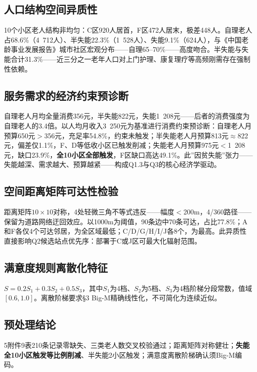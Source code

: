 \subsection{人口结构空间异质性}

10个小区老人结构非均匀：C区920人居首，F区472人居末，极差448人。自理老人占68.6\%（4~712人）、半失能22.3\%（1~528人）、失能9.1\%（624人），与《中国老龄事业发展报告》城市社区宏观分布——自理65--70\%——高度吻合。半失能与失能合计31.3\%——近三分之一老年人口对上门护理、康复理疗等高频刚需存在强制性依赖。

\subsection{服务需求的经济约束预诊断}

自理老人月均全量消费356元，半失能822元，失能1~208元——后者的消费强度为自理老人的3.4倍。以人均月收入3~250元为基准进行消费约束预诊断：自理老人月预算650元$>$356元，充足率54.8\%，约束未触发；半失能老人月预算813元$\approx$822元，偏差仅1.1\%，F、D等低收小区已触发削减；失能老人月预算975元$<$1~208元，缺口23.9\%，\textbf{全10小区全部触发}，F区缺口高达49.1\%。此”因贫失能”张力——失能越深、需求越大、预算越紧——构成Q1.3与Q3的核心经济学驱动。

\subsection{空间距离矩阵可达性检验}

距离矩阵$10\times 10$对称，4处轻微三角不等式违反——幅度$<$200m，4/360路径——保留为道路网络迂回效应。以1000m为阈值，90条边中70条可达，占比77.8\%；A和F各仅4个可达邻居，为全区域最低；C/D/G/H/I/J各8个，为最高。此异质性直接影响Q2候选站点优先序：部署于C或J区可最大化辐射范围。

\subsection{满意度规则离散化特征}

$S = 0.2S_1 + 0.3S_2 + 0.5S_3$，其中$S_1$为4档、$S_2$为5档、$S_3$为4档阶梯分段常数，值域$[0.6,1.0]$。离散阶梯要求§3 Big-M精确线性化，不可简化为连续近似。

\subsection{预处理结论}

5附件9表210条记录零缺失、三类老人数交叉校验通过；距离矩阵对称健壮；\textbf{失能全10小区触发等比例削减}、半失能2小区触发；满意度离散阶梯确认须Big-M编码。
